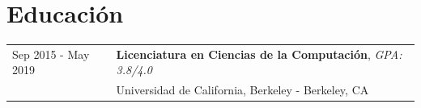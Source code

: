 

\section{Educación}
\begin{tabularx}{\linewidth}{@{}l X@{}}	
Sep 2015 - May 2019 & \textbf{Licenciatura en Ciencias de la Computación}, \textit{GPA: 3.8/4.0} \\
& Universidad de California, Berkeley - Berkeley, CA \\
\end{tabularx}
